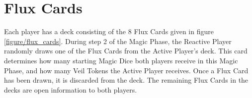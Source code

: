 \section{Flux Cards}
\label{flux_cards}

Each player has a deck consisting of the 8 Flux Cards given in figure \ref{figure/flux_cards}. During step 2 of the Magic Phase, the Reactive Player randomly draws one of the Flux Cards from the Active Player's deck. This card determines how many starting Magic Dice both players receive in this Magic Phase, and how many Veil Tokens the Active Player receives. Once a Flux Card has been drawn, it is discarded from the deck. The remaining Flux Cards in the decks are open information to both players.

\begin{figure}[!htbp]
	\centering
	\def\fluxcardwidth{0.23\textwidth}
	\def\fluxcardgap{-0.01\textwidth}
	
	\def\FluxCardTitle{\Largefontsize\textbf{Flux Card 1}}
	\def\FluxCardDice{%
	\textbf{4 Magic Dice}\par
	(both players)}
	\def\FluxCardVeil{\textbf{3 Veil Tokens}\par
	(Active Player)}
	\def\FluxCardMiscast{\normalfontsize All Miscasts this phase gain a \textbf{+1} Miscast Modifier}
	\def\svgwidth{\fluxcardwidth}
	
	\hspace{\fluxcardgap}
	\def\FluxCardTitle{\Largefontsize\textbf{Flux Card 2}}
	\def\FluxCardDice{%
	\textbf{5 Magic Dice}\par
	(both players)}
	\def\FluxCardVeil{\textbf{2 Veil Tokens}\par
	(Active Player)}
	\def\FluxCardMiscast{}
	\def\svgwidth{\fluxcardwidth}
	
	\hspace{\fluxcardgap}
	\def\FluxCardTitle{\Largefontsize\textbf{Flux Card 3}}
	\def\FluxCardDice{%
	\textbf{5 Magic Dice}\par
	(both players)}
	\def\FluxCardVeil{\textbf{5 Veil Tokens}\par
	(Active Player)}
	\def\FluxCardMiscast{}
	\def\svgwidth{\fluxcardwidth}
	
	\hspace{\fluxcardgap}
	\def\FluxCardTitle{\Largefontsize\textbf{Flux Card 4}}
	\def\FluxCardDice{%
	\textbf{5 Magic Dice}\par
	(both players)}
	\def\FluxCardVeil{\textbf{7 Veil Tokens}\par
	(Active Player)}
	\def\FluxCardMiscast{}
	\def\svgwidth{\fluxcardwidth}
	
	

\end{figure}
